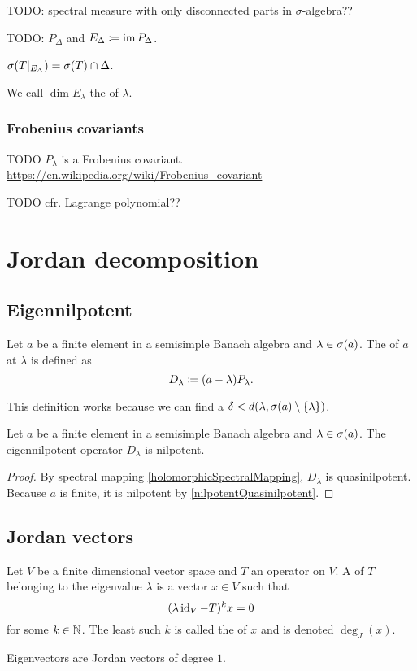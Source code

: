 TODO: spectral measure with only disconnected parts in $\sigma$-algebra??

TODO: $P_\Delta$ and $E_\Delta \coloneqq \operatorname{im} P_\Delta$.

\begin{lemma}
$\sigma(T|_{E_\Delta}) = \sigma(T)\cap\Delta$.
\end{lemma}

\begin{definition}
We call $\dim E_\lambda$ the  of $\lambda$.
\end{definition}

\subsubsection{Frobenius covariants}
TODO $P_\lambda$ is a Frobenius covariant. \url{https://en.wikipedia.org/wiki/Frobenius_covariant}

TODO cfr. Lagrange polynomial??

\section{Jordan decomposition}
\subsection{Eigennilpotent}
\begin{definition}
Let $a$ be a finite element in a semisimple Banach algebra and $\lambda\in \sigma(a)$. The  of $a$ at $\lambda$ is defined as
\[ D_{\lambda} \coloneqq (a-\lambda)P_{\lambda}. \]
\end{definition}
This definition works because we can find a $\delta < d(\lambda, \sigma(a)\setminus\{\lambda\})$.

\begin{lemma}
Let $a$ be a finite element in a semisimple Banach algebra and $\lambda\in \sigma(a)$. The eigennilpotent operator $D_\lambda$ is nilpotent.
\end{lemma}
\begin{proof}
By spectral mapping \ref{holomorphicSpectralMapping}, $D_\lambda$ is quasinilpotent. Because $a$ is finite, it is nilpotent by \ref{nilpotentQuasinilpotent}.
\end{proof}



\subsection{Jordan vectors}
\begin{definition}
Let $V$ be a finite dimensional vector space and $T$ an operator on $V$. A  of $T$ belonging to the eigenvalue $\lambda$ is a vector $x\in V$ such that
\[ (\lambda\operatorname{id}_V - T)^kx = 0 \]
for some $k\in \mathbb{N}$. The least such $k$ is called the  of $x$ and is denoted $\deg_J(x)$.
\end{definition}
Eigenvectors are Jordan vectors of degree $1$.

